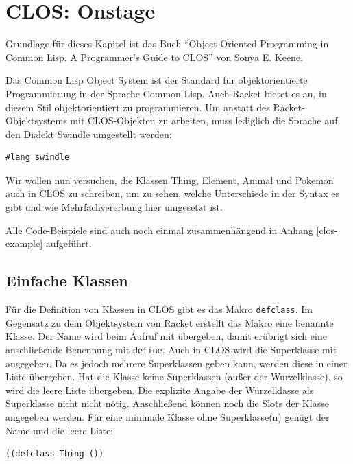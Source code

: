 \section{CLOS: Onstage}
Grundlage für dieses Kapitel ist das Buch ``Object-Oriented Programming in Common Lisp. A Programmer's Guide to CLOS''\cite{keene} von Sonya E. Keene. 

Das Common Lisp Object System ist der Standard für objektorientierte Programmierung in der Sprache Common Lisp. Auch Racket bietet es an, in diesem Stil objektorientiert zu programmieren. Um anstatt des Racket-Objektsystems mit CLOS-Objekten zu arbeiten, muss lediglich die Sprache auf den Dialekt Swindle umgestellt werden:


\begin{lstlisting}
#lang swindle
\end{lstlisting}

Wir wollen nun versuchen, die Klassen Thing, Element, Animal und Pokemon auch in CLOS zu schreiben, um zu sehen, welche Unterschiede in der Syntax es gibt und wie Mehrfachvererbung hier umgesetzt ist. 

Alle Code-Beispiele sind auch noch einmal zusammenhängend in Anhang \ref{clos-example} aufgeführt.

\subsection{Einfache Klassen}
Für die Definition von Klassen in CLOS gibt es das Makro \texttt{defclass}. Im Gegensatz zu dem Objektsystem von Racket erstellt das Makro eine benannte Klasse. Der Name wird beim Aufruf mit übergeben, damit erübrigt sich eine anschließende Benennung mit \texttt{define}. Auch in CLOS wird die Superklasse mit angegeben. Da es jedoch mehrere Superklassen geben kann, werden diese in einer Liste übergeben. Hat die Klasse keine Superklassen (außer der Wurzelklasse), so wird die leere Liste übergeben. Die explizite Angabe der Wurzelklasse als Superklasse nicht nicht nötig. Anschließend können noch die Slots der Klasse angegeben werden. Für eine minimale Klasse ohne Superklasse(n) genügt der Name und die leere Liste: 

\begin{lstlisting}
((defclass Thing ())
\end{lstlisting}


